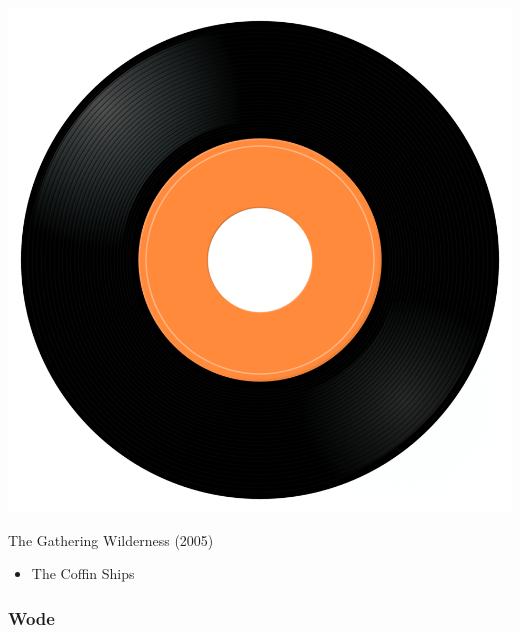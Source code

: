 \begin{minipage}[t]{0.25\textwidth}
\captionsetup{type=figure}
\includegraphics[width=\textwidth]{Images/cover.png}
\caption*{The Gathering Wilderness (2005)}
\end{minipage}
\begin{minipage}[t]{0.25\textwidth}\vspace{0pt}
\begin{itemize}[nosep,leftmargin=1em,labelwidth=*,align=left]
	\setlength{\itemsep}{0pt}
	\item The Coffin Ships
\end{itemize}
\end{minipage}

\subsubsection{Wode}


